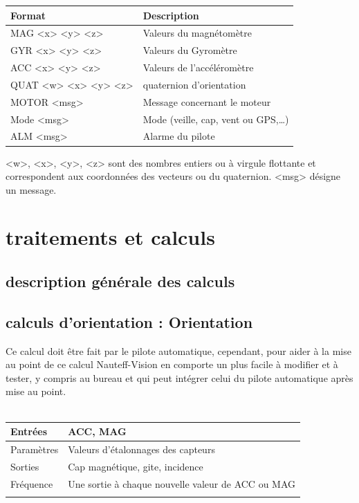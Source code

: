 \documentclass[a4paper,11pt]{report}
\begin{document}
\begin{tabular}{l|l}
	Format & Description \\
	\hline 
	MAG  <x> <y> <z> & Valeurs du magnétomètre  \\ 
	\hline 
	GYR  <x> <y> <z> & Valeurs du  Gyromètre \\ 
	\hline 
	ACC  <x> <y> <z>     & Valeurs de l'accéléromètre \\ 
	\hline 
	QUAT  <w> <x> <y> <z>  & \Gls{quaternion} d'orientation \\ 
	\hline
	MOTOR <msg> & Message concernant le moteur \\ 
	\hline 
	Mode <msg>& Mode (veille, cap, vent ou GPS,\dots) \\ 
	\hline 
	ALM <msg> & Alarme du pilote \\ 
\end{tabular}

<w>, <x>, <y>, <z> sont des nombres entiers ou à virgule flottante
et correspondent aux coordonnées des vecteurs ou du quaternion.
<msg> désigne un message.



\section{traitements et calculs}
\subsection{description générale des calculs}
\subsection{calculs d'orientation : Orientation}
Ce calcul doit être fait par le pilote automatique, cependant, pour aider
à la mise au point de ce calcul Nauteff-Vision en comporte un plus facile
à modifier et à tester, y compris au bureau et qui peut intégrer celui 
du pilote automatique après mise au point.
\\
\\
\begin{tabular}{|l|p{6cm}|}
	\hline 
	Entrées & ACC, MAG \\ 
	\hline 
    Paramètres & Valeurs d'étalonnages des capteurs  \\ 
	\hline 
	Sorties &  Cap magnétique, \gls{gite}, incidence\\ 
	\hline 
	Fréquence & Une sortie à chaque nouvelle valeur de ACC ou MAG \\
	\hline 
	&  \\ 
	\hline
	
\end{tabular} 
\end{document}

